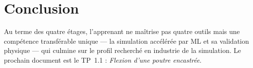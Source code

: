 \documentclass[10pt,journal]{IEEEtran}
\begin{document}
\section{Conclusion}
Au terme des quatre étages, l'apprenant ne maîtrise pas \og quatre outils\fg{} mais une compétence transférable unique --- la simulation accélérée par ML et sa validation physique --- qui culmine sur le profil recherché en industrie de la simulation. Le prochain document est le TP~1.1 : \emph{Flexion d'une poutre encastrée}.
\end{document}
